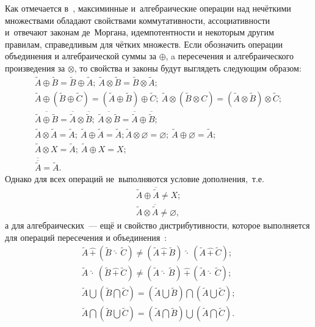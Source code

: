 Как отмечается в~\cite{Axioms_Fuzzy_Algebra, Kaufmann, Lipetsk}, максиминные и~алгебраические операции над нечёткими множествами обладают свойствами коммутативности, ассоциативности и~отвечают законам де~Моргана, идемпотентности и некоторым другим правилам, справедливым для чётких множеств. Если обозначить операции объединения и алгебраической суммы за $\oplus$, a пересечения и алгебраического произведения за $\otimes$, то свойства и законы будут выглядеть следующим образом:
\begin{gather*}
	\tilde A \oplus \tilde B = \tilde B \oplus \tilde A;\ \tilde A \otimes \tilde B = \tilde B \otimes \tilde A; \allowbreak \\
	\tilde A \oplus \left(\tilde B \oplus \tilde C \right) = \left( \tilde A \oplus \tilde B \right) \oplus \tilde C;\ \tilde A \otimes \left(\tilde B \otimes C \right) = \left( \tilde A \otimes \tilde B \right) \otimes \tilde C; \allowbreak \\
	\overline{\tilde A \oplus \tilde B}=\overline{\tilde A} \otimes \overline{\tilde B};\  \overline{\tilde A \otimes \tilde B}=\overline{\tilde A} \oplus \overline{\tilde B}; \allowbreak \\
	\tilde A \otimes \tilde A = \tilde A;\ \tilde A \oplus \tilde A = \tilde A;
	\tilde A \otimes \varnothing = \varnothing;\ \tilde A \oplus \varnothing = \tilde A; \allowbreak \\
	\tilde A \otimes X = \tilde A;\ \tilde A \oplus X = X; \\
	\overline{\overline{\tilde A}} = \tilde A.
\end{gather*}
Однако для всех операций не~выполняются условие дополнения,~т.е.
\begin{gather*}
	\tilde{A} \oplus \overline{\tilde{A}}\ne X; \\
	\tilde{A} \otimes \overline{\tilde{A}}\ne \varnothing,
\end{gather*}
а для алгебраических~--- ещё и свойство дистрибутивности, которое выполняется для операций пересечения и объединения~\cite{Ryzhov}:
\begin{gather*}
	\tilde{A}\, \widehat{+}\, \left( \tilde{B}\ \widehat{\cdot}\ \tilde C \right) \neq \left( \tilde A\, \widehat{+}\, \tilde B \right)\ \widehat{\cdot}\ \left(\tilde A\, \widehat{+}\, \tilde C \right); \\
		\tilde{A}\ \widehat{\cdot}\ \left( \tilde{B}\, \widehat{+}\, \tilde C \right) \neq \left( \tilde A\ \widehat{\cdot}\ \tilde B \right)\, \widehat{+}\, \left(\tilde A\ \widehat{\cdot}\ \tilde C \right); \\
	\tilde A \bigcup \left( \tilde B \bigcap \tilde C \right) = \left(\tilde A \bigcup \tilde B \right) \bigcap \left(\tilde A \bigcup \tilde C \right); \\
	\tilde A \bigcap \left( \tilde B \bigcup \tilde C \right) = \left(\tilde A \bigcap \tilde B \right) \bigcup \left(\tilde A \bigcap \tilde C \right).
\end{gather*}

